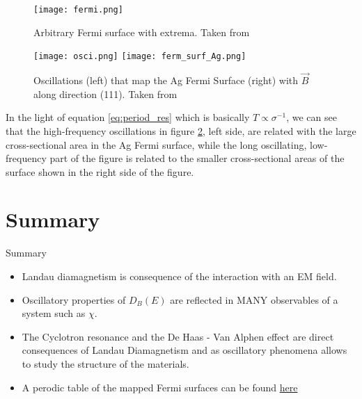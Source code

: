 \documentclass{beamer}
\begin{document}
\begin{frame}

  \begin{figure}
      \centering
      \texttt{[image: fermi.png]}
      \caption{Arbitrary Fermi surface with extrema. Taken from\cite{dresselhaus}}
      \label{fig:fermi}
  \end{figure}
\end{frame}
\begin{frame}
  \begin{figure}
      \centering
      \texttt{[image: osci.png]}
      \texttt{[image: ferm\_surf\_Ag.png]}

      \caption{Oscillations (left) that map the Ag Fermi Surface (right) with $\vec{B}$ along direction (111). Taken from  \cite{dresselhaus}}
      \label{fig:osci}
  \end{figure}
 
\end{frame}
\begin{frame}
   In the light of equation \ref{eq:period_res} which is basically $T \propto \sigma^{-1}$, we can see that the high-frequency oscillations in figure \ref{fig:osci}, left side, are related with the large cross-sectional area in the Ag Fermi surface, while the long oscillating, low-frequency part of the figure is related to the smaller cross-sectional areas of the surface shown in the right side of the figure.
\end{frame}


\section*{Summary}

\begin{frame}{Summary}
  \begin{itemize}
  \item
    Landau diamagnetism is consequence of the interaction with an EM field.
  \item
    Oscillatory properties of $D_B(E)$ are reflected in MANY observables of a system such as $\chi$.
  \item The Cyclotron resonance and the De Haas - Van Alphen effect are direct consequences of Landau Diamagnetism and as oscillatory phenomena allows to study the structure of the materials.
  \item A perodic table of the mapped Fermi surfaces can be found \href{http://www.phys.ufl.edu/fermisurface/periodic_table.html}{here}
  \end{itemize}
 
\end{frame}
\end{document}
